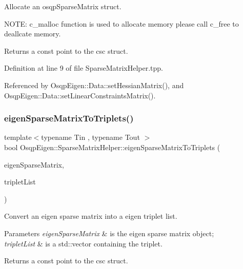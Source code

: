 Allocate an osqp\+Sparse\+Matrix struct. 

N\+O\+TE\+: {\ttfamily c\+\_\+malloc} function is used to allocate memory please call {\ttfamily c\+\_\+free} to deallcate memory. \begin{DoxyReturn}{Returns}
a const point to the csc struct. 
\end{DoxyReturn}


Definition at line 9 of file Sparse\+Matrix\+Helper.\+tpp.



Referenced by Osqp\+Eigen\+::\+Data\+::set\+Hessian\+Matrix(), and Osqp\+Eigen\+::\+Data\+::set\+Linear\+Constraints\+Matrix().

\mbox{\label{namespaceOsqpEigen_1_1SparseMatrixHelper_ad0dac7c63fc97d0ceddadd5145d9b5c6}} 
\subsubsection{\texorpdfstring{eigen\+Sparse\+Matrix\+To\+Triplets()}{eigenSparseMatrixToTriplets()}}
{\footnotesize\ttfamily template$<$typename Tin , typename Tout $>$ \\
bool Osqp\+Eigen\+::\+Sparse\+Matrix\+Helper\+::eigen\+Sparse\+Matrix\+To\+Triplets (\begin{DoxyParamCaption}\item[{const Eigen\+::\+Sparse\+Matrix$<$ Tin $>$ \&}]{eigen\+Sparse\+Matrix,  }\item[{std\+::vector$<$ Eigen\+::\+Triplet$<$ Tout $>$$>$ \&}]{triplet\+List }\end{DoxyParamCaption})}



Convert an eigen sparse matrix into a eigen triplet list. 


\begin{DoxyParams}{Parameters}
{\em eigen\+Sparse\+Matrix} & is the eigen sparse matrix object; \\
\hline
{\em triplet\+List} & is a std\+::vector containing the triplet. \\
\hline
\end{DoxyParams}
\begin{DoxyReturn}{Returns}
a const point to the csc struct. 
\end{DoxyReturn}


